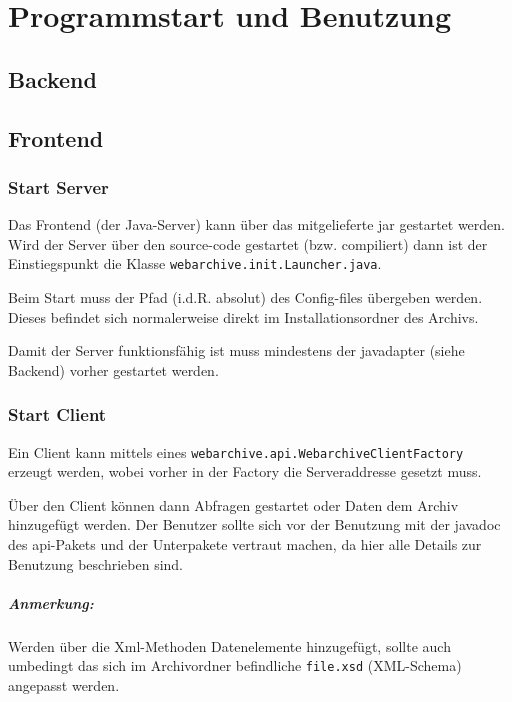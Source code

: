 \chapter{Programmstart und Benutzung}
	\section{Backend}
	\section{Frontend}
		\subsection{Start Server}
		Das Frontend (der Java-Server) kann über das mitgelieferte jar gestartet werden.
		Wird der Server über den source-code gestartet (bzw. compiliert) dann ist der Einstiegspunkt
		die Klasse \lstinline{webarchive.init.Launcher.java}.

		Beim Start muss der Pfad (i.d.R. absolut) des Config-files übergeben werden. 
		Dieses befindet sich normalerweise direkt im Installationsordner des Archivs.

		Damit der Server funktionsfähig ist muss mindestens der javadapter (siehe Backend)
		vorher gestartet werden.
		\subsection{Start Client}
		Ein Client kann mittels eines \lstinline{webarchive.api.WebarchiveClientFactory} erzeugt werden,
		wobei vorher in der Factory die Serveraddresse gesetzt muss.
		
		Über den Client können dann Abfragen gestartet oder Daten dem Archiv hinzugefügt werden. 
		Der Benutzer sollte sich vor der Benutzung mit der javadoc des api-Pakets und der Unterpakete vertraut machen,
		da hier alle Details zur Benutzung beschrieben sind.
		\paragraph{Anmerkung:} Werden über die Xml-Methoden Datenelemente hinzugefügt, 
		sollte auch umbedingt das sich im Archivordner befindliche \lstinline{file.xsd} (XML-Schema)
		angepasst werden.
	

